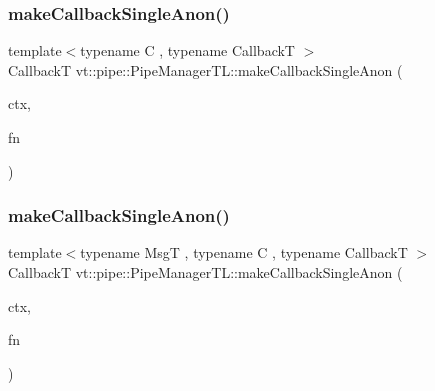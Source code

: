 \subsubsection{\texorpdfstring{make\+Callback\+Single\+Anon()}{makeCallbackSingleAnon()}\hspace{0.1cm}{\footnotesize\ttfamily [4/6]}}
{\footnotesize\ttfamily template$<$typename C , typename CallbackT $>$ \\
CallbackT vt\+::pipe\+::\+Pipe\+Manager\+T\+L\+::make\+Callback\+Single\+Anon (\begin{DoxyParamCaption}\item[{C $\ast$}]{ctx,  }\item[{\hyperlink{structvt_1_1pipe_1_1_pipe_manager_base_ad8463823b6b4cfdb67c119d6d22e3bac}{Func\+Ctx\+Type}$<$ C $>$}]{fn }\end{DoxyParamCaption})}

\mbox{\label{structvt_1_1pipe_1_1_pipe_manager_t_l_a5f29e3456069847eddd1b64bcecca2f2}} 
\subsubsection{\texorpdfstring{make\+Callback\+Single\+Anon()}{makeCallbackSingleAnon()}\hspace{0.1cm}{\footnotesize\ttfamily [5/6]}}
{\footnotesize\ttfamily template$<$typename MsgT , typename C , typename CallbackT $>$ \\
CallbackT vt\+::pipe\+::\+Pipe\+Manager\+T\+L\+::make\+Callback\+Single\+Anon (\begin{DoxyParamCaption}\item[{C $\ast$}]{ctx,  }\item[{\hyperlink{structvt_1_1pipe_1_1_pipe_manager_base_a73fdf82ece0411b3dc644c99b763f7a9}{Func\+Msg\+Ctx\+Type}$<$ MsgT, C $>$}]{fn }\end{DoxyParamCaption})}

\mbox{\label{structvt_1_1pipe_1_1_pipe_manager_t_l_a49d1f142e82be5584fa5b9e5ccf85272}} 
